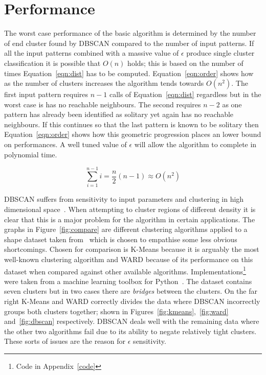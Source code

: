 \documentclass{ecsarticle}     %
\begin{document}
\section{Performance}

The worst case performance of the basic algorithm is determined by the number of end cluster found by DBSCAN compared to the number of input patterns.
If all the input patterns combined with a massive value of $\epsilon$ produce single cluster classification it is possible that $O(n)$ holds; this is based on the number of times Equation~\eqref{eqn:dist} has to be computed.
Equation~\eqref{eqn:order} shows how as the number of clusters increases the algorithm tends towards $O(n^2)$.
The first input pattern requires $n-1$ calls of Equation~\eqref{eqn:dist} regardless but in the worst case is has no reachable neighbours.
The second requires $n-2$ as one pattern has already been identified as solitary yet again has no reachable neighbours.
If this continues so that the last pattern is known to be solitary then Equation~\eqref{eqn:order} shows how this geometric progression places an lower bound on performances.
A well tuned value of $\epsilon$ will allow the algorithm to complete in polynomial time.

\begin{equation}
	\sum\limits_{i=1}^{n-1} i = \frac{n}{2}(n - 1) \approx O(n^2)	
	\label{eqn:order}
\end{equation}


DBSCAN suffers from sensitivity to input parameters and clustering in high dimensional space~\cite{han01survey}.
When attempting to cluster regions of different density it is clear that this is a major problem for the algorithm in certain applications. 
The graphs in Figure~\ref{fig:compare} are different clustering algorithms applied to a shape dataset taken from~\cite{gionis05cluster} which is chosen to empathise some less obvious shortcomings.
Chosen for comparison is K-Means because it is arguably the most well-known clustering algorithm and WARD because of its performance on this dataset when compared against other available algorithms.
Implementations\footnote{Code in Appendix~\ref{code}} were taken from a machine learning toolbox for Python~\citep{scikit13ml}.
The dataset contains seven clusters but in two cases there are \emph{bridges} between the clusters.
On the far right K-Means and WARD correctly divides the data where DBSCAN incorrectly groups both clusters together; shown in Figures~\ref{fig:kmeans},~\ref{fig:ward} and~\ref{fig:dbscan} respectively.
DBSCAN deals well with the remaining data where the other two algorithms fail due to its ability to negate relatively tight clusters.
These sorts of issues are the reason for $\epsilon$ sensitivity. 
\end{document}
